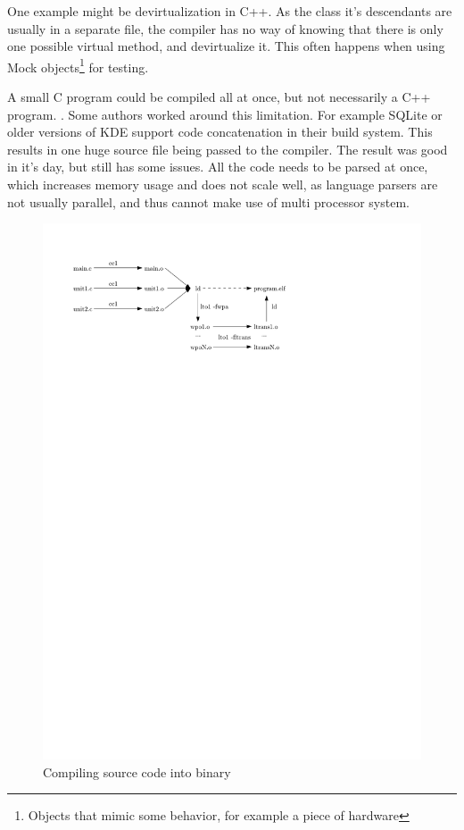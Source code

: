 One example might be devirtualization in C++. As the class it's descendants are
usually in a separate file, the compiler has no way of knowing that there is
only one possible virtual method, and devirtualize it. This often happens when
using Mock objects\footnote{Objects that mimic some behavior, for example a
piece of hardware} for testing.

A small C program could be compiled all at once, but not necessarily a C++
program. . Some authors worked around this
limitation. For example SQLite or older versions of KDE support code
concatenation in their build system. This results in one huge source file being
passed to the compiler. The result was good in it's day, but still has some
issues. All the code needs to be parsed at once, which increases memory usage
and does not scale well, as language parsers are not usually parallel, and thus
cannot make use of multi processor system.

\begin{figure}[h!]
	\label{figure-lto-workflow}
	\centering
	\includegraphics{./img/lto-workflow.pdf}
	\caption{Compiling source code into binary}
\end{figure}

